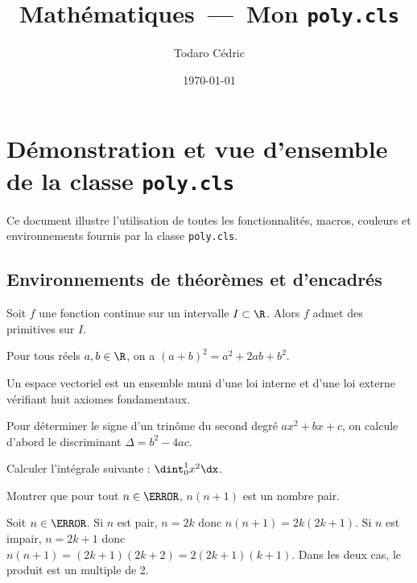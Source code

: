 \documentclass{poly}
\title{Mathématiques~---~Mon \texttt{poly.cls}}
\author{Todaro Cédric}
\date{\today}
\begin{document}
\maketitle
\tableofcontents
\chapter{Démonstration et vue d'ensemble de la classe \texttt{poly.cls}}

Ce document illustre l'utilisation de toutes les fonctionnalités, macros, couleurs et environnements fournis par la classe \texttt{poly.cls}.

\section{Environnements de théorèmes et d'encadrés}

\begin{thm}
	Soit $f$ une fonction continue sur un intervalle $I \subset \R$. Alors $f$ admet des primitives sur $I$.
\end{thm}

\begin{prop}
	Pour tous réels $a, b \in \R$, on a $(a+b)^2 = a^2 + 2ab + b^2$.
\end{prop}

\begin{df}
	Un espace vectoriel est un ensemble muni d'une loi interne et d'une loi externe vérifiant huit axiomes fondamentaux.
\end{df}

\begin{meth}
	Pour déterminer le signe d'un trinôme du second degré $ax^2+bx+c$, on calcule d'abord le discriminant $\Delta = b^2 - 4ac$.
\end{meth}

\begin{exercice}
	Calculer l'intégrale suivante : $\dint_{0}^{1} x^2 \dx$.
\end{exercice}

\begin{exo}
	Montrer que pour tout $n \in \N$, $n(n+1)$ est un nombre pair.
\end{exo}

\begin{demo}
	Soit $n \in \N$. Si $n$ est pair, $n=2k$ donc $n(n+1) = 2k(2k+1)$. Si $n$ est impair, $n=2k+1$ donc $n(n+1) = (2k+1)(2k+2) = 2(2k+1)(k+1)$. Dans les deux cas, le produit est un multiple de 2.
\end{demo}
\end{document}
